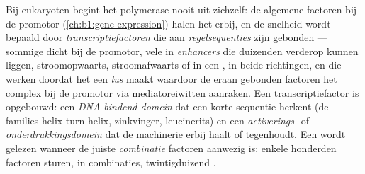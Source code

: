 \begin{definition}\label{def:b1:expression-control:enhancer}
Bij eukaryoten begint het polymerase nooit uit zichzelf: de algemene factoren bij
de promotor (\cref{ch:b1:gene-expression}) halen het erbij, en de snelheid wordt
bepaald door \emph{transcriptiefactoren} die aan \emph{regelsequenties} zijn
gebonden --- sommige dicht bij de promotor, vele in \emph{enhancers} die
duizenden  verderop kunnen liggen, stroomopwaarts, stroomafwaarts of in
een , in beide richtingen, en die werken doordat het  een \emph{lus} maakt
waardoor de eraan gebonden factoren het complex bij de promotor via
mediatoreiwitten aanraken. Een transcriptiefactor is  opgebouwd: een
\emph{DNA-bindend domein} dat een korte sequentie herkent (de families
helix-turn-helix, zinkvinger, leucinerits) en een \emph{activerings-} of
\emph{onderdrukkingsdomein} dat de machinerie erbij haalt of tegenhoudt. Een 
wordt gelezen wanneer de juiste \emph{combinatie} factoren aanwezig is: enkele
honderden factoren sturen, in combinaties, twintigduizend .
\end{definition}

